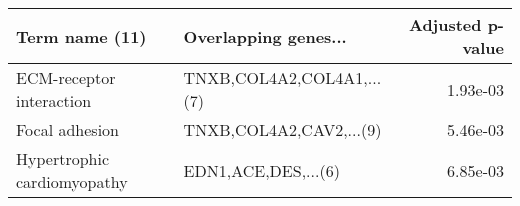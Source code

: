 \begin{tabular}{llr}
\toprule
             Term name (11) &      Overlapping genes... &  Adjusted p-value \\
\midrule
   ECM-receptor interaction & TNXB,COL4A2,COL4A1,...(7) &          1.93e-03 \\
             Focal adhesion &   TNXB,COL4A2,CAV2,...(9) &          5.46e-03 \\
Hypertrophic cardiomyopathy &       EDN1,ACE,DES,...(6) &          6.85e-03 \\
\bottomrule
\end{tabular}

